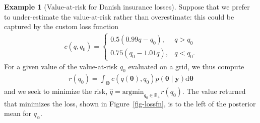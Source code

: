 \documentclass[
  11pt,
  letterpaper,
]{scrbook}
\theoremstyle{definition}
\newtheorem{example}{Example}[chapter]
\theoremstyle{plain}
\theoremstyle{plain}
\theoremstyle{plain}
\theoremstyle{definition}
\theoremstyle{definition}
\theoremstyle{plain}
\theoremstyle{plain}
\theoremstyle{remark}
\begin{document}
\begin{example}[Value-at-risk for Danish insurance
losses]
Suppose that we prefer to under-estimate the value-at-risk rather than
overestimate: this could be captured by the custom loss function
\begin{align*}
c(q, q_0) = 
\begin{cases}
0.5(0.99q - q_0), & q > q_0 \\
0.75(q_0 - 1.01q), & q < q_0.
\end{cases}
\end{align*} For a given value of the value-at-risk \(q_0\) evaluated on
a grid, we thus compute \begin{align*}
 r(q_0) = \int_{\boldsymbol{\Theta}}c(q(\boldsymbol{\theta}), q_0) p (\boldsymbol{\theta} \mid \boldsymbol{y}) \mathrm{d} \boldsymbol{\theta}
\end{align*} and we seek to minimize the risk,
\(\widehat{q} =\mathrm{argmin}_{q_0 \in \mathbb{R}_{+}} r(q_0).\) The
value returned that minimizes the loss, shown in
Figure~\ref{fig-lossfn}, is to the left of the posterior mean for
\(q_\alpha.\)


\end{example}
\end{document}
